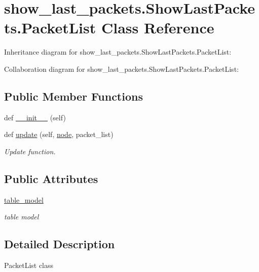 \hypertarget{classshow__last__packets_1_1ShowLastPackets_1_1PacketList}{}\section{show\+\_\+last\+\_\+packets.\+Show\+Last\+Packets.\+Packet\+List Class Reference}
\label{classshow__last__packets_1_1ShowLastPackets_1_1PacketList}


Inheritance diagram for show\+\_\+last\+\_\+packets.\+Show\+Last\+Packets.\+Packet\+List\+:


Collaboration diagram for show\+\_\+last\+\_\+packets.\+Show\+Last\+Packets.\+Packet\+List\+:
\subsection*{Public Member Functions}
\begin{DoxyCompactItemize}
\item 
def \hyperlink{classshow__last__packets_1_1ShowLastPackets_1_1PacketList_aad6c8f29f849a8f35a43734109c9b69d}{\+\_\+\+\_\+init\+\_\+\+\_\+} (self)
\item 
def \hyperlink{classshow__last__packets_1_1ShowLastPackets_1_1PacketList_a51e6a83c0720f200ed97d1406a19bcb2}{update} (self, \hyperlink{classshow__last__packets_1_1ShowLastPackets_a0c618af7788119c3c1c4927a512f3558}{node}, packet\+\_\+list)
\begin{DoxyCompactList}\small\item\em Update function. \end{DoxyCompactList}\end{DoxyCompactItemize}
\subsection*{Public Attributes}
\begin{DoxyCompactItemize}
\item 
\hyperlink{classshow__last__packets_1_1ShowLastPackets_1_1PacketList_af32a6f7770460214514bb2e4279ec267}{table\+\_\+model}
\begin{DoxyCompactList}\small\item\em table model \end{DoxyCompactList}\end{DoxyCompactItemize}


\subsection{Detailed Description}
\begin{DoxyVerb}PacketList class
\end{DoxyVerb}
 

